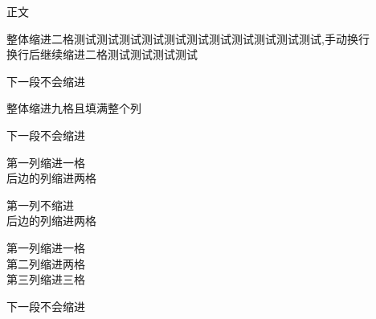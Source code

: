 \documentclass{ltc-guji}
\begin{document}
\begin{正文}
正文

\begin{段落}[indent=2]
整体缩进二格测试测试测试测试测试测试测试测试测试测试测试,手动换行\\
换行后继续缩进二格测试测试测试测试
\end{段落}

下一段不会缩进

\begin{段落}[indent=9]
整体缩进九格且填满整个列
\end{段落}

下一段不会缩进

\begin{段落}[indent=2,first-indent=1]
第一列缩进一格\\
后边的列缩进两格
\end{段落}

\begin{段落}[indent=2,first-indent=0]
第一列不缩进\\
后边的列缩进两格
\end{段落}

\begin{段落}[indent=2]
第一列缩进一格\\
第二列缩进两格\\
第三列缩进三格\\
\end{段落}

下一段不会缩进

\end{正文}
\end{document}

